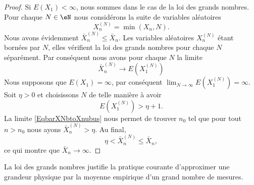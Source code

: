 \begin{proof}
	Si \( E(X_1)<\infty\), nous sommes dans le cas de la loi des grands nombres. Pour chaque \( N\in\eN\) nous considérons la suite de variables aléatoires
	\begin{equation}
		X_n^{(N)}=\min(X_n,N).
	\end{equation}
	Nous avons évidemment \( \bar X^{(N)}_n\leq \bar X_n\). Les variables aléatoires \( X^{(N)}_n\) étant bornées par \( N\), elles vérifient la loi des grands nombres pour chaque \( N\) séparément. Par conséquent nous avons pour chaque \( N\) la limite
	\begin{equation}        \label{EqbarXNbtoXnubus}
		\bar X^{(N)}_n\to E(X^{(N)}_1)
	\end{equation}
	Nous supposons que \( E(X_1)=\infty\), par conséquent  \( \lim_{N\to\infty}E(X_1^{(N)})=\infty\). Soit \( \eta>0\) et choisissons \( N\) de telle manière à avoir
	\begin{equation}
		E(X_1^{(N)})>\eta+1.
	\end{equation}
	La limite \eqref{EqbarXNbtoXnubus} nous permet de trouver \( n_0\) tel que pour tout \( n>n_0\) nous ayons \( \bar X^{(N)}_n>\eta\). Au final,
	\begin{equation}
		\eta<\bar X^{(N)}_n\leq \bar X_n,
	\end{equation}
	ce qui montre que \( \bar X_n\to\infty\).
\end{proof}

\begin{example}
	La loi des grands nombres justifie la pratique courante d'approximer une grandeur physique par la moyenne empirique d'un grand nombre de mesures.
\end{example}


